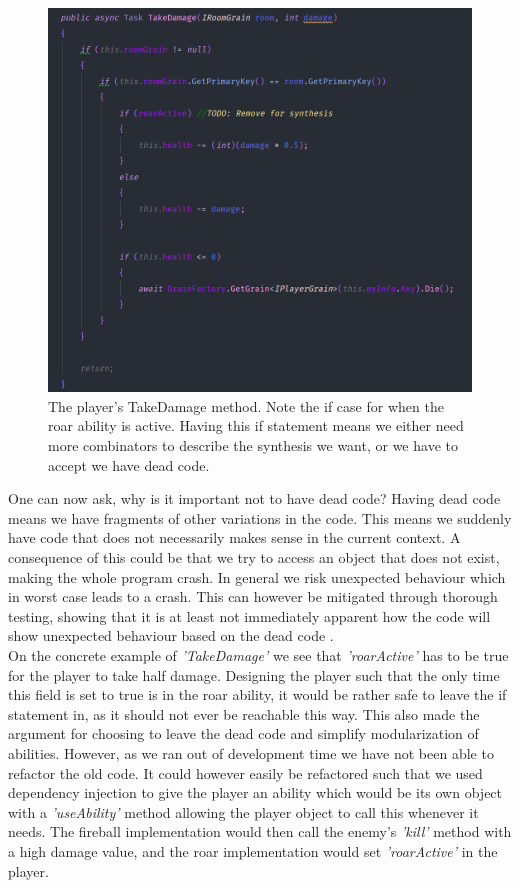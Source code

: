 \begin{figure}[H]
	\centering
	\includegraphics[width=0.8\linewidth]{Materials/Decomposition/TakeDamage}
	\caption{The player's TakeDamage method. Note the if case for when the roar ability is active. Having this if statement means we either need more combinators to describe the synthesis we want, or we have to accept we have dead code. }
	\label{PlayerTakeDamage}
\end{figure}
One can now ask, why is it important not to have dead code? Having dead code means we have fragments of other variations in the code. This means we suddenly have code that does not necessarily makes sense in the current context. A consequence of this could be that we try to access an object that does not exist, making the whole program crash. In general we risk unexpected behaviour which in worst case leads to a crash. This can however be mitigated through thorough testing, showing that it is at least not immediately apparent how the code will show unexpected behaviour based on the dead code .\\
On the concrete example of \textit{'TakeDamage'} we see that \textit{'roarActive'} has to be true for the player to take half damage. Designing the player such that the only time this field is set to true is in the roar ability, it would be rather safe to leave the if statement in, as it should not ever be reachable this way. This also made the argument for choosing to leave the dead code and simplify modularization of abilities. However, as we ran out of development time we have not been able to refactor the old code. It could however easily be refactored such that we used dependency injection to give the player an ability which would be its own object with a \textit{'useAbility'} method allowing the player object to call this whenever it needs. The fireball implementation would then call the enemy's \textit{'kill'} method with a high damage value, and the roar implementation would set \textit{'roarActive'} in the player.\\ 
